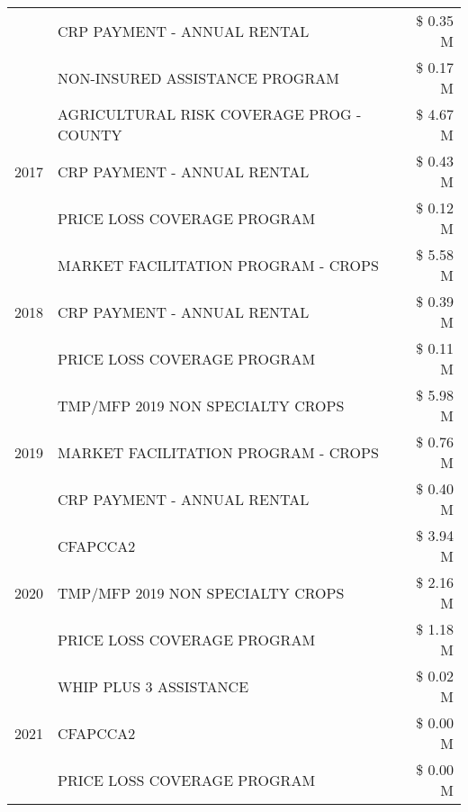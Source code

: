 \begin{tabular}{llr}
 & CRP PAYMENT - ANNUAL RENTAL                   & \$ 0.35 M \\
 & NON-INSURED ASSISTANCE PROGRAM                & \$ 0.17 M \\
\cline{1-3}
\multirow[t]{3}{*}{2017} & AGRICULTURAL RISK COVERAGE PROG - COUNTY & \$ 4.67 M \\
 & CRP PAYMENT - ANNUAL RENTAL & \$ 0.43 M \\
 & PRICE LOSS COVERAGE PROGRAM & \$ 0.12 M \\
\cline{1-3}
\multirow[t]{3}{*}{2018} & MARKET FACILITATION PROGRAM - CROPS & \$ 5.58 M \\
 & CRP PAYMENT - ANNUAL RENTAL & \$ 0.39 M \\
 & PRICE LOSS COVERAGE PROGRAM & \$ 0.11 M \\
\cline{1-3}
\multirow[t]{3}{*}{2019} & TMP/MFP 2019 NON SPECIALTY CROPS & \$ 5.98 M \\
 & MARKET FACILITATION PROGRAM - CROPS & \$ 0.76 M \\
 & CRP PAYMENT - ANNUAL RENTAL & \$ 0.40 M \\
\cline{1-3}
\multirow[t]{3}{*}{2020} & CFAPCCA2 & \$ 3.94 M \\
 & TMP/MFP 2019 NON SPECIALTY CROPS & \$ 2.16 M \\
 & PRICE LOSS COVERAGE PROGRAM & \$ 1.18 M \\
\cline{1-3}
\multirow[t]{3}{*}{2021} & WHIP PLUS 3 ASSISTANCE & \$ 0.02 M \\
 & CFAPCCA2 & \$ 0.00 M \\
 & PRICE LOSS COVERAGE PROGRAM & \$ 0.00 M \\
\cline{1-3}
\bottomrule
\end{tabular}
